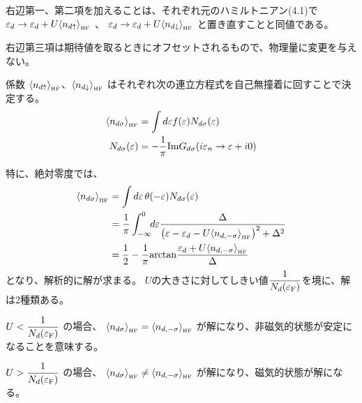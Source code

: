 \documentclass[a4j]{jarticle}
\begin{document}
右辺第一、第二項を加えることは、それぞれ元のハミルトニアン(4.1)で
$\varepsilon_{d} \to \varepsilon_{d} + U \langle n_{d \uparrow} \rangle_{{}_{\rm HF}}$
、
$\varepsilon_{d} \to \varepsilon_{d} + U \langle n_{d \downarrow} \rangle_{{}_{\rm HF}}$
と置き直すことと同値である。

右辺第三項は期待値を取るときにオフセットされるもので、物理量に変更を与えない。

係数
$\langle n_{d \uparrow} \rangle_{{}_{\rm HF}}$、$\langle n_{d \downarrow} \rangle_{{}_{\rm HF}}$
はそれぞれ次の連立方程式を自己無撞着に回すことで決定する。
\begin{align}
	\langle n_{d \sigma} \rangle_{{}_{\rm HF}}
	 & =
	\int d \varepsilon
	f(\varepsilon) N_{d \sigma}(\varepsilon)
	\label{eqn:motonon}
	\\
	N_{d \sigma}(\varepsilon)
	 & =
	-
	\frac{1}{\pi}
	{\rm Im}G_{d \sigma}(i \varepsilon_{n} \to \varepsilon + i0)
\end{align}

特に、絶対零度では、
\begin{align}
	\langle n_{d \sigma} \rangle_{{}_{\rm HF}}
	 & =
	\int d \varepsilon
	\ \!
	\theta(- \varepsilon) N_{d \sigma}(\varepsilon)
	\nonumber \\ &=
	\frac{1}{\pi}
	\int^{0}_{-\infty}
	\!\!
	d \varepsilon
	\frac{
		\Delta
	}{
		\big(
		\varepsilon
		-
		\varepsilon_{d}
		-
		U
		\langle n_{d, -\sigma} \rangle_{{}_{\rm HF}}
		\big)^{2}
		+
		\Delta^{2}
	}
	\nonumber \\ &=
	\frac{1}{2}
	-
	\frac{1}{\pi}
	{\rm arctan}
	\frac{
		\varepsilon_{d}
		+
		U
		\langle n_{d, -\sigma} \rangle_{{}_{\rm HF}}
	}{
		\Delta
	}
	\label{eqn:hfnumber}
\end{align}
となり、解析的に解が求まる。
$U$の大きさに対してしきい値$\dfrac{1}{N_{d}(\varepsilon_{\rm F})}$を境に、解は2種類ある。

$U < \dfrac{1}{N_{d}(\varepsilon_{\rm F})}$
の場合、
$
	\langle n_{d \sigma} \rangle_{{}_{\rm HF}}
	=
	\langle n_{d, -\sigma} \rangle_{{}_{\rm HF}}
$
が解になり、非磁気的状態が安定になることを意味する。

$U > \dfrac{1}{N_{d}(\varepsilon_{\rm F})}$
の場合、
$
	\langle n_{d \sigma} \rangle_{{}_{\rm HF}}
	\neq
	\langle n_{d, -\sigma} \rangle_{{}_{\rm HF}}
$
が解になり、磁気的状態が解になる。

\ \\[2mm]
\end{document}
